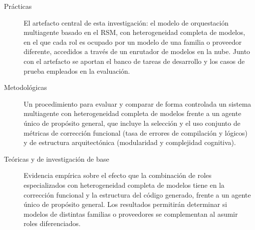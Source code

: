 \begin{description}
  \item[Prácticas] El artefacto central de esta investigación: el modelo
    de orquestación multiagente basado en el RSM, con
    heterogeneidad completa de modelos, en el que cada rol es ocupado por
    un modelo de una familia o proveedor diferente, accedidos a través de
    un enrutador de modelos en la nube. Junto con el artefacto se aportan
    el banco de tareas de desarrollo y los casos de prueba empleados en la
    evaluación.

  \item[Metodológicas] Un procedimiento para evaluar y comparar de
    forma controlada un sistema multiagente con heterogeneidad completa
    de modelos frente a un agente único de propósito general, que
    incluye la selección y el uso conjunto de métricas de corrección
    funcional (tasa de errores de compilación y lógicos) y de estructura
    arquitectónica (modularidad y complejidad cognitiva).

  \item[Teóricas y de investigación de base] Evidencia empírica sobre el
    efecto que la combinación de roles especializados con heterogeneidad
    completa de modelos tiene en la corrección funcional y la estructura
    del código generado, frente a un agente único de propósito general.
    Los resultados permitirán determinar si modelos de distintas familias
    o proveedores se complementan al asumir roles diferenciados.
\end{description}
